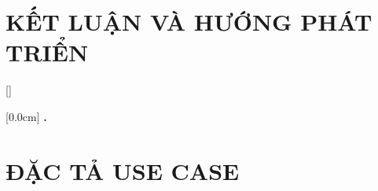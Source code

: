 \documentclass[a4paper,13pt,3p,twoside]{report}
\renewcommand{\bibname}{Danh_sach_tai_lieu_tham_khao}
\theoremstyle{definition}
\begin{document}
\chapter{KẾT LUẬN VÀ HƯỚNG PHÁT TRIỂN} %
\label{chapter:conclusion}


\newpage
\renewcommand\bibname{TÀI LIỆU THAM KHẢO}
\printbibliography
{}

\appendixpage
\appendices
\addappheadtotoc


{}[]
\titlespacing*{\chapter}{0pt}{-20pt}{20pt}

    [0.0cm]             %
    {\bfseries\vspace{0.3cm}}                  %
    {{\bfseries{\scshape} \thecontentslabel.\ }} %
    {}         %
    {\contentspage}         %
\chapter{ĐẶC TẢ USE CASE}
\label{chapter:AppendixA}

\end{document}
